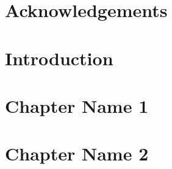 \documentclass[a4paper, 12pt]{book}
\begin{document}
\frontmatter

{}


\cleardoublepage


\cleardoublepage
{}
{}



\cleardoublepage
{}
\chapter*{Acknowledgements}


% 

\cleardoublepage
{}
{}
\tableofcontents

\cleardoublepage
{}
\listofillustrations


\mainmatter


\cleardoublepage
\chapter{Introduction}


\cleardoublepage
\chapter{Chapter Name 1}%
\label{chap:chap_name1}



\cleardoublepage
\chapter{Chapter Name 2}%
\label{chap:chap_name2}


\end{document}
